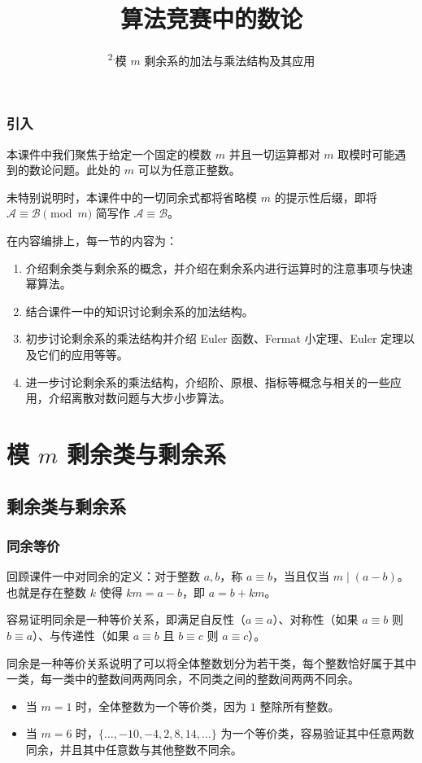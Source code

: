 \documentclass{../pkslide}
\title[算法竞赛中的数论（二）]{算法竞赛中的数论}
\subtitle{\texorpdfstring{\textsuperscript{2.}}{2. }模 \texorpdfstring{$m$}{m} 剩余系的加法与乘法结构及其应用}
\begin{document}
\begin{frame}
  \frametitle{引入}
  本课件中我们聚焦于给定一个固定的模数 $m$ 并且一切运算都对 $m$ 取模时可能遇到的数论问题。此处的 $m$ 可以为任意正整数。
  
  未特别说明时，本课件中的一切同余式都将省略模 $m$ 的提示性后缀，即将 $\mathcal A \equiv \mathcal B \pmod m$ 简写作 $\mathcal A \equiv \mathcal B$。
  
  \pause
  在内容编排上，每一节的内容为：
  
  \begin{enumerate}
    \item 介绍剩余类与剩余系的概念，并介绍在剩余系内进行运算时的注意事项与快速幂算法。
    \item 结合课件一中的知识讨论剩余系的加法结构。
    \item 初步讨论剩余系的乘法结构并介绍 Euler 函数、Fermat 小定理、Euler 定理以及它们的应用等等。
    \item 进一步讨论剩余系的乘法结构，介绍阶、原根、指标等概念与相关的一些应用，介绍离散对数问题与大步小步算法。
  \end{enumerate}
\end{frame}

\section{模 \texorpdfstring{$m$}{m} 剩余类与剩余系}
\subsection{剩余类与剩余系}
\pseudosubsubsection

\begin{frame}
  \frametitle{同余等价}
  回顾课件一中对同余的定义：对于整数 $a, b$，称 $a \equiv b$，当且仅当 $m \mid (a - b)$。也就是存在整数 $k$ 使得 $k m = a - b$，即 $a = b + k m$。
  
  容易证明同余是一种等价关系，即满足自反性（$a \equiv a$）、对称性（如果 $a \equiv b$ 则 $b \equiv a$）、与传递性（如果 $a \equiv b$ 且 $b \equiv c$ 则 $a \equiv c$）。
  
  \pause
  同余是一种等价关系说明了可以将全体整数划分为若干类，每个整数恰好属于其中一类，每一类中的整数间两两同余，不同类之间的整数间两两不同余。
  
  \pause
  \begin{example}[等价类]
    \begin{itemize}
      \item 当 $m = 1$ 时，全体整数为一个等价类，因为 $1$ 整除所有整数。
      \item 当 $m = 6$ 时，$\{ \ldots, -10, -4, 2, 8, 14, \ldots \}$ 为一个等价类，容易验证其中任意两数同余，并且其中任意数与其他整数不同余。
    \end{itemize}
  \end{example}
\end{frame}
\end{document}
